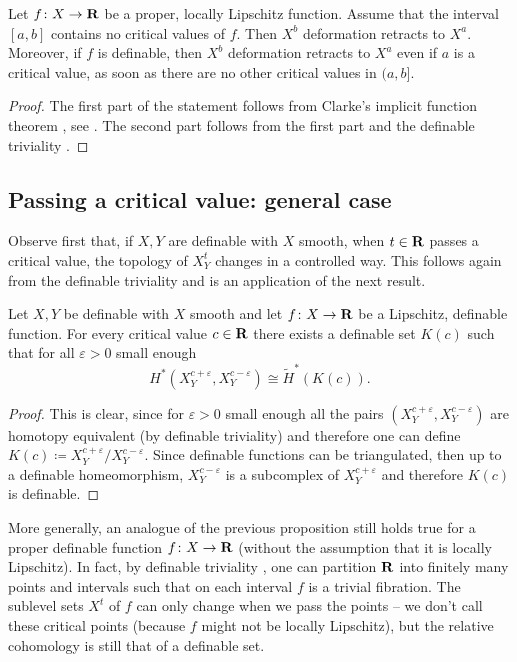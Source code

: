 \begin{lemma}
\label{D!lem:deformation}
  Let $f \colon X \to \mathbf{R}$ be a proper, locally Lipschitz function. Assume that the interval $[a, b]$ contains no critical values of $f$. Then $X^b$ deformation retracts to $X^a$. 
  Moreover, if $f$ is definable, then $X^b$ deformation retracts to $X^a$ even if $a$ is a critical value, as soon as there are no other critical values in $(a, b]$.
\end{lemma}

\begin{proof}
  The first part of the statement follows from Clarke's implicit function theorem \cite[Theorem 1]{clarkeIFT}, see \cite[Proposition 1.2]{APS1997}. The second part follows from the first  part and the definable triviality \cite[Chapter 9, Theorem 1.2]{vdd}.
\end{proof}

\subsection{Passing a critical value: general case}\label{D!sec:triviality}

Observe first that, if $X, Y$ are definable with $X$ smooth, when $t \in \mathbf{R}$ passes a critical value, the topology of $X_Y^t$ changes in a controlled way. This follows again from the definable triviality and is an application of the next result.

\begin{proposition}
\label{D!propo:criticalpass1}
  Let $X, Y$ be definable with $X$ smooth and let $f \colon X \to \mathbf{R}$ be a Lipschitz, definable function. For every critical value $c \in \mathbf{R}$ there exists a definable set $K(c)$ such that for all $\varepsilon > 0$ small enough
  \[
    H^*(X_Y^{c + \varepsilon}, X_Y^{c - \varepsilon}) \cong \widetilde{H}^*(K(c)).
  \]
\end{proposition}

\begin{proof}
  This is clear, since for $\varepsilon > 0$ small enough all the pairs $(X_Y^{c + \varepsilon}, X_Y^{c - \varepsilon})$ are homotopy equivalent (by definable triviality) and therefore one can define $K(c) \coloneq X_Y^{c + \varepsilon}/X_Y^{c - \varepsilon}$. Since definable functions can be triangulated, then up to a definable homeomorphism, $X_Y^{c - \varepsilon}$ is a subcomplex of $X_Y^{c + \varepsilon}$ and therefore $K(c)$ is definable.
\end{proof}

\begin{remark}
  More generally, an analogue of the previous proposition still holds true for a proper definable function $f \colon X\to \mathbf{R}$ (without the assumption that it is locally Lipschitz). 
  In fact, by definable triviality \cite[Chapter 9, Theorem 1.2]{vdd},  one can partition $\mathbf{R}$ into finitely many points and intervals such that on each interval $f$ is a trivial fibration. The sublevel sets $X^t$ of $f$ can only change when we pass the points -- we don't call these critical points (because $f$ might not be locally Lipschitz), but the relative cohomology is still that of a definable set.
\end{remark}

